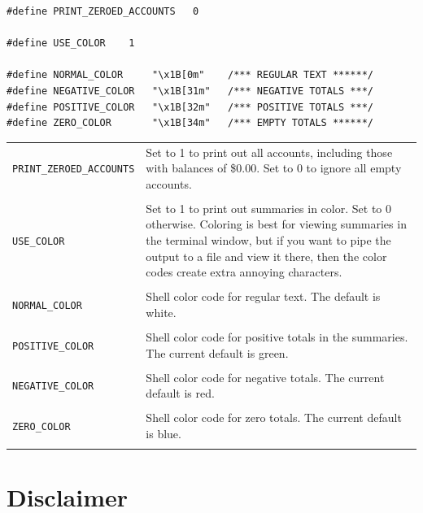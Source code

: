 \documentclass{article}
\begin{document}
\begin{flushleft}
\begin{lstlisting}
#define PRINT_ZEROED_ACCOUNTS   0

#define USE_COLOR    1

#define NORMAL_COLOR     "\x1B[0m"    /*** REGULAR TEXT ******/
#define NEGATIVE_COLOR   "\x1B[31m"   /*** NEGATIVE TOTALS ***/
#define POSITIVE_COLOR   "\x1B[32m"   /*** POSITIVE TOTALS ***/
#define ZERO_COLOR       "\x1B[34m"   /*** EMPTY TOTALS ******/
\end{lstlisting}


\begin{center}
\begin{tabular}{lp{11cm}}
{\tt PRINT\_ZEROED\_ACCOUNTS} & Set to 1 to print out all accounts, including those with balances of \$0.00. Set to 0 to ignore all empty accounts. \\ \\

{\tt USE\_COLOR} & Set to 1 to print out summaries in color. Set to 0 otherwise. Coloring is best for viewing summaries
in the terminal window, but if you want to pipe the output to a file and view it there, then the color codes create extra 
annoying characters. \\ \\

{\tt NORMAL\_COLOR } & Shell color code for regular text. The default is white. \\ \\

{\tt POSITIVE\_COLOR } & Shell color code for positive totals in the summaries. The current default is green. \\ \\

{\tt NEGATIVE\_COLOR } & Shell color code for negative totals. The current default is red. \\ \\

{\tt ZERO\_COLOR } & Shell color code for zero totals. The current default is blue. \\ \\


\end{tabular}
\end{center}



\section{Disclaimer}


\end{flushleft}
\end{document}
